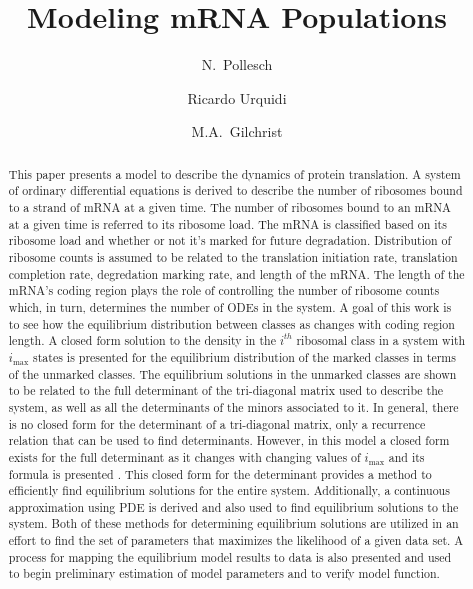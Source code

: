 \documentclass[review]{elsarticle}
\newcommand{\imax}{\ensuremath{i_{\max}}\xspace}
\begin{document}
\title{Modeling mRNA Populations}
\author[utkm,curradd]{N.~Pollesch}
\author[utkgst]{Ricardo Urquidi}
\author[utkeeb,nimbios,cor1]{M.A.~Gilchrist}
\address[utkm]{Department of Mathematics, University of Tennessee,  Knoxville, TN 37996-1320}
\address[utkeeb]{Department of Ecology and Evolutionary Biology, University of Tennessee, Knoxville, TN 37996-1610}
\address[nimbios]{National Institute for Mathematical and Biological Synthesis, University of Tennessee, Knoxville, TN 37996-3410}
\address[utkgst]{Genome Science and Technology Program, University of Tennessee, Knoxville, TN 37996-XXX}

\begin{abstract}
This paper presents a model to describe the dynamics of protein translation.  
A system of ordinary differential equations is derived to describe the number of ribosomes bound to a strand of mRNA at a given time.
The number of ribosomes bound to an mRNA at a given time is referred to its ribosome load.
The mRNA is classified based on its ribosome load and whether or not it's marked for future degradation.  
Distribution of ribosome counts is assumed to be related to the translation initiation rate, translation completion rate, degredation marking rate, and length of the mRNA.
The length of the mRNA's coding region plays the role of controlling the number of ribosome counts which, in turn, determines the number of ODEs in the system.  
A goal of this work is to see how the equilibrium distribution between classes as changes with coding region length.
A closed form solution to the density in the $i^{th}$ ribosomal class in a system with \imax states is presented for the equilibrium distribution of the marked classes in terms of the unmarked classes.
The equilibrium solutions in the unmarked classes are shown to be related to the full determinant of the tri-diagonal matrix used to describe the system, as well as all the determinants of the minors associated to it.
In general, there is no closed form for the determinant of a tri-diagonal matrix, only a recurrence relation that can be used to find determinants.
However, in this model a closed form exists for the full determinant as it changes with changing values of \imax and its formula is presented .
This closed form for the determinant provides a method to efficiently find equilibrium solutions for the entire system.
Additionally, a continuous approximation using PDE is derived and also used to find equilibrium solutions to the system.
Both of these methods for determining equilibrium solutions are utilized in an effort to find the set of parameters that maximizes the likelihood of a given data set.
A process for mapping the equilibrium model results to data is also presented and used to begin preliminary estimation of model parameters and to verify model function.
 

\end{abstract}
\end{document}
